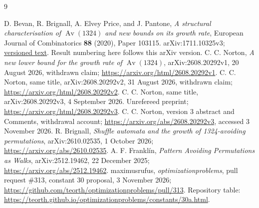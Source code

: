 \documentclass[11pt]{amsart}
\numberwithin{equation}{section}
\theoremstyle{remark}\newtheorem{remark}[theorem]{Remark}
\newcommand{\Av}{\operatorname{Av}}
\begin{document}
\begin{thebibliography}{9}
\raggedright
{} D. Bevan, R. Brignall, A. Elvey Price, and J. Pantone,
\emph{A structural characterisation of $\Av(1324)$ and new bounds on its growth rate},
European Journal of Combinatorics \textbf{88} (2020), Paper 103115.
 arXiv:1711.10325v3;
\href{https://arxiv.org/html/1711.10325v3}{versioned text}. Result numbering here follows this arXiv version.
 C. C. Norton, \emph{A new lower bound for the growth rate of $\Av(1324)$}, arXiv:2608.20292v1, 20 August 2026, withdrawn claim;
\url{https://arxiv.org/html/2608.20292v1}.
 C. C. Norton, same title, arXiv:2608.20292v2, 31 August 2026, withdrawn claim;
\url{https://arxiv.org/html/2608.20292v2}.
 C. C. Norton, same title, arXiv:2608.20292v3, 4 September 2026. Unrefereed preprint;
\url{https://arxiv.org/html/2608.20292v3}.
 C. C. Norton, version 3 abstract and Comments, withdrawal account;
\url{https://arxiv.org/abs/2608.20292v3}, accessed 3 November 2026.
 R. Brignall, \emph{Shuffle automata and the growth of 1324-avoiding permutations}, arXiv:2610.02535, 1 October 2026;
\url{https://arxiv.org/abs/2610.02535}.
 A. F. Frankl\'in, \emph{Pattern Avoiding Permutations as Walks}, arXiv:2512.19462, 22 December 2025;
\url{https://arxiv.org/abs/2512.19462}.
 maximusrufus, \emph{optimizationproblems}, pull request \#313, constant 30 proposal, 3 November 2026;
\url{https://github.com/teorth/optimizationproblems/pull/313}. Repository table:
\url{https://teorth.github.io/optimizationproblems/constants/30a.html}.
\end{thebibliography}
\end{document}
